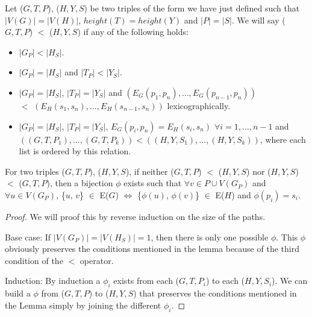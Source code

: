 \begin{definition}
Let ($G, T, P$), ($H, Y, S$) be two triples of the form we have just defined such that $|V(G)| = |V(H)|$, $height(T) = height(Y)$ and $|P| = |S|$. We will say ($G, T, P$) $<$ ($H, Y, S$) if any of the following holds:
 
\begin{itemize}
\item $|G_P| < |H_S|$.
\item $|G_P| = |H_S|$ and $|T_P| < |Y_S|$.
\item $|G_P| = |H_S|$, $|T_P| = |Y_S|$ and $(E_G(p_1, p_n), \ldots, E_G(p_{n-1}, p_n))$ \\ $ < $ $(E_H(s_1, s_n), \ldots, E_H(s_{n-1}, s_n))$ lexicographically.
\item $|G_P| = |H_S|$, $|T_P| = |Y_S|$, $E_G(p_i, p_n) = E_H(s_i, s_n)$ $\forall i = 1, \ldots, n-1$ and $((G, T, P_1), \ldots, (G, T, P_k)) < ((H, Y, S_1), \ldots, (H, Y, S_k))$, where each list is ordered by this relation.
\end{itemize}
 
\begin{lemma}
For two triples ($G, T, P$), ($H, Y, S$), if neither ($G, T, P$) $<$ ($H, Y, S$) nor ($H, Y, S$) $<$ ($G, T, P$), then a  bijection $\phi$ exists such that $\forall v \in P \cup V(G_P)$ and $\forall u \in V(G_P)$, \{$u$, $v$\} $\in$ E($G$) $\iff$ \{$\phi(u)$, $\phi(v)$\} $\in$ E($H$) and $\phi(p_i) = s_i$.
\end{lemma}
 
\begin{proof}
We will proof this by reverse induction on the size of the paths.

Base case: 
If $|V(G_P)| = |V(H_S)| = 1$, then there is only one possible $\phi$. This $\phi$ obviously preserves the conditions mentioned in the lemma because of the third condition of the $<$ operator.

Induction:
By induction a $\phi_i$ exists from each ($G, T, P_i$) to each ($H, Y, S_i$). We can build a $\phi$ from ($G, T, P$) to ($H, Y, S$) that preserves the conditions mentioned in the Lemma simply by joining the different $\phi_i$.
\end{proof}
 
\end{definition}